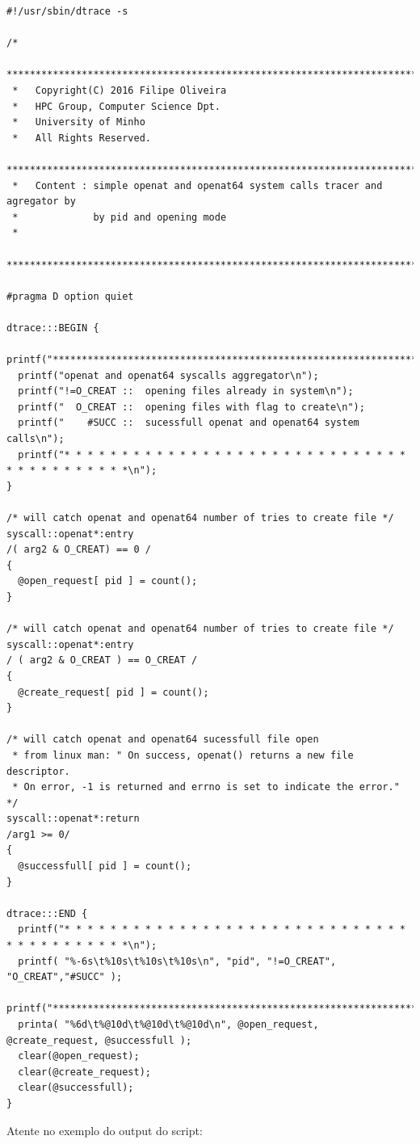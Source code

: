 \documentclass[a4paper]{article}
\begin{document}
\begin{lstlisting}
#!/usr/sbin/dtrace -s

/*
 ********************************************************************************
 *   Copyright(C) 2016 Filipe Oliveira
 *   HPC Group, Computer Science Dpt.
 *   University of Minho
 *   All Rights Reserved.
 ********************************************************************************
 *   Content : simple openat and openat64 system calls tracer and agregator by
 *             by pid and opening mode
 *     
 ********************************************************************************/

#pragma D option quiet

dtrace:::BEGIN {
  printf("*********************************************************************************\n");
  printf("openat and openat64 syscalls aggregator\n");
  printf("!=O_CREAT ::  opening files already in system\n");
  printf("  O_CREAT ::  opening files with flag to create\n"); 
  printf("    #SUCC ::  sucessfull openat and openat64 system calls\n");
  printf("* * * * * * * * * * * * * * * * * * * * * * * * * * * * * * * * * * * * * * * * *\n");
}

/* will catch openat and openat64 number of tries to create file */
syscall::openat*:entry 
/( arg2 & O_CREAT) == 0 /
{
  @open_request[ pid ] = count();
}

/* will catch openat and openat64 number of tries to create file */
syscall::openat*:entry 
/ ( arg2 & O_CREAT ) == O_CREAT /
{
  @create_request[ pid ] = count();
}

/* will catch openat and openat64 sucessfull file open
 * from linux man: " On success, openat() returns a new file descriptor. 
 * On error, -1 is returned and errno is set to indicate the error."  */
syscall::openat*:return
/arg1 >= 0/
{
  @successfull[ pid ] = count();
}

dtrace:::END {
  printf("* * * * * * * * * * * * * * * * * * * * * * * * * * * * * * * * * * * * * * * * *\n");
  printf( "%-6s\t%10s\t%10s\t%10s\n", "pid", "!=O_CREAT", "O_CREAT","#SUCC" );
  printf("*********************************************************************************\n");
  printa( "%6d\t%@10d\t%@10d\t%@10d\n", @open_request, @create_request, @successfull );
  clear(@open_request);
  clear(@create_request);
  clear(@successfull);
}
\end{lstlisting}

Atente no exemplo do output do script:
\end{document}
